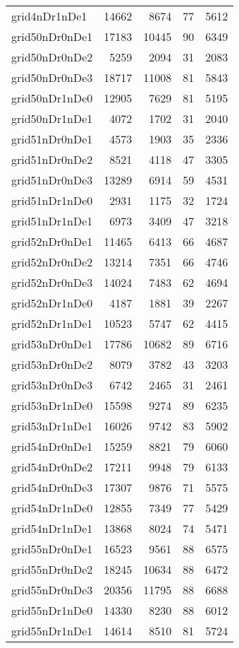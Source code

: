 \documentclass[../../../thesis.tex]{subfiles}
\begin{document}
\begin{longtable}{lrrrr}
grid4nDr1nDe1 & 14662 & 8674 & 77 & 5612 \\
grid50nDr0nDe1 & 17183 & 10445 & 90 & 6349 \\
grid50nDr0nDe2 & 5259 & 2094 & 31 & 2083 \\
grid50nDr0nDe3 & 18717 & 11008 & 81 & 5843 \\
grid50nDr1nDe0 & 12905 & 7629 & 81 & 5195 \\
grid50nDr1nDe1 & 4072 & 1702 & 31 & 2040 \\
grid51nDr0nDe1 & 4573 & 1903 & 35 & 2336 \\
grid51nDr0nDe2 & 8521 & 4118 & 47 & 3305 \\
grid51nDr0nDe3 & 13289 & 6914 & 59 & 4531 \\
grid51nDr1nDe0 & 2931 & 1175 & 32 & 1724 \\
grid51nDr1nDe1 & 6973 & 3409 & 47 & 3218 \\
grid52nDr0nDe1 & 11465 & 6413 & 66 & 4687 \\
grid52nDr0nDe2 & 13214 & 7351 & 66 & 4746 \\
grid52nDr0nDe3 & 14024 & 7483 & 62 & 4694 \\
grid52nDr1nDe0 & 4187 & 1881 & 39 & 2267 \\
grid52nDr1nDe1 & 10523 & 5747 & 62 & 4415 \\
grid53nDr0nDe1 & 17786 & 10682 & 89 & 6716 \\
grid53nDr0nDe2 & 8079 & 3782 & 43 & 3203 \\
grid53nDr0nDe3 & 6742 & 2465 & 31 & 2461 \\
grid53nDr1nDe0 & 15598 & 9274 & 89 & 6235 \\
grid53nDr1nDe1 & 16026 & 9742 & 83 & 5902 \\
grid54nDr0nDe1 & 15259 & 8821 & 79 & 6060 \\
grid54nDr0nDe2 & 17211 & 9948 & 79 & 6133 \\
grid54nDr0nDe3 & 17307 & 9876 & 71 & 5575 \\
grid54nDr1nDe0 & 12855 & 7349 & 77 & 5429 \\
grid54nDr1nDe1 & 13868 & 8024 & 74 & 5471 \\
grid55nDr0nDe1 & 16523 & 9561 & 88 & 6575 \\
grid55nDr0nDe2 & 18245 & 10634 & 88 & 6472 \\
grid55nDr0nDe3 & 20356 & 11795 & 88 & 6688 \\
grid55nDr1nDe0 & 14330 & 8230 & 88 & 6012 \\
grid55nDr1nDe1 & 14614 & 8510 & 81 & 5724 \\

\end{longtable}
\end{document}
